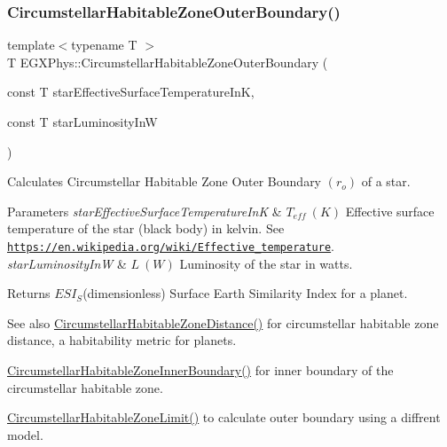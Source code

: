 \subsubsection{\texorpdfstring{Circumstellar\+Habitable\+Zone\+Outer\+Boundary()}{CircumstellarHabitableZoneOuterBoundary()}}
{\footnotesize\ttfamily template$<$typename T $>$ \\
T E\+G\+X\+Phys\+::\+Circumstellar\+Habitable\+Zone\+Outer\+Boundary (\begin{DoxyParamCaption}\item[{const T}]{star\+Effective\+Surface\+Temperature\+InK,  }\item[{const T}]{star\+Luminosity\+InW }\end{DoxyParamCaption})}



Calculates Circumstellar Habitable Zone Outer Boundary $(r_o)$ of a star. 


\begin{DoxyParams}{Parameters}
{\em star\+Effective\+Surface\+Temperature\+InK} & $T_{eff}\ (K)$ Effective surface temperature of the star (black body) in kelvin. See \href{https://en.wikipedia.org/wiki/Effective_temperature}{\tt https\+://en.\+wikipedia.\+org/wiki/\+Effective\+\_\+temperature}. \\
\hline
{\em star\+Luminosity\+InW} & $L\ (W)$ Luminosity of the star in watts. \\
\hline
\end{DoxyParams}
\begin{DoxyReturn}{Returns}
$ESI_S$(dimensionless) Surface Earth Similarity Index for a planet. 
\end{DoxyReturn}
\begin{DoxySeeAlso}{See also}
\mbox{\hyperlink{group___e_g_x_phys-_circumstellar_habitable_zone_limit_ga3247e5fe14db39121ce622207af172fd}{Circumstellar\+Habitable\+Zone\+Distance()}} for circumstellar habitable zone distance, a habitability metric for planets. 

\mbox{\hyperlink{group___e_g_x_phys-_circumstellar_habitable_zone_limit_gab31a33d0dbd3ecd00537832b5b836d73}{Circumstellar\+Habitable\+Zone\+Inner\+Boundary()}} for inner boundary of the circumstellar habitable zone. 

\mbox{\hyperlink{group___e_g_x_phys-_circumstellar_habitable_zone_limit_ga809f4c557ce6d2fe566a69c2a8a5d41b}{Circumstellar\+Habitable\+Zone\+Limit()}} to calculate outer boundary using a diffrent model. 
\end{DoxySeeAlso}
\mbox{\label{group___e_g_x_phys-_circumstellar_habitable_zone_limit_ga0eb1003b4cfcbcafde635cefca5ae5c2}} 
